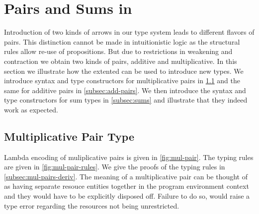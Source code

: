 \section{Pairs and Sums in  \qub{}}\label{sec:pairs-types}
Introduction of two kinds of arrows in our type system leads to different flavors of pairs. This distinction cannot be made
in intuitionistic logic as the structural rules allow re-use of propositions. But due to restrictions in weakening and
contraction we obtain two kinds of pairs, additive and multiplicative. In this section we illustrate how the
extented \qub{} can be used to introduce new types. We introduce syntax and type constructors for multiplicative pairs in \cref{subsec:mul-pairs}
and the same for additive pairs in \cref{subsec:add-pairs}. We then introduce the
syntax and type constructors for sum types in \cref{subsec:sums} and illustrate that they indeed work as expected.

\subsection{Multiplicative Pair Type}\label{subsec:mul-pairs}
Lambda encoding of muliplicative pairs is given in \cref{fig:mul-pair}. The typing rules
are given in \cref{fig:mul-pair-rules}. We give the proofs of the typing rules in \cref{subsec:mul-pairs-deriv}.
The meaning of a multiplicative pair can be thought of as
having separate resouce entities together in the program environment context and they would have to be
explicitly disposed off. Failure to do so, would raise a type error regarding the resources
not being unrestricted.

